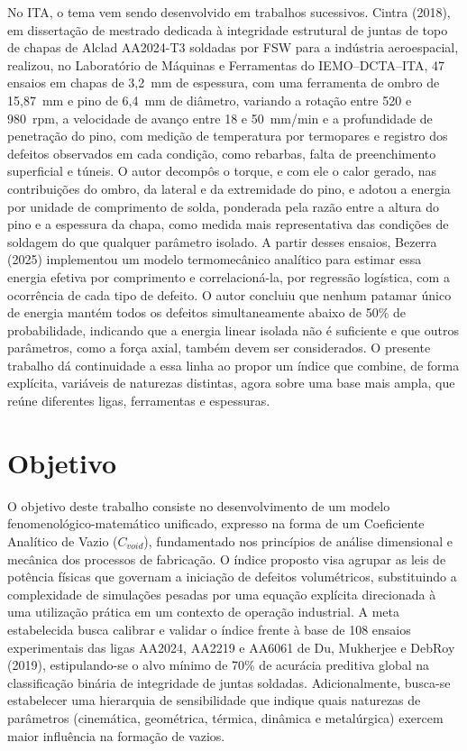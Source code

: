 \documentclass[12pt,openany]{report}
\begin{document}
No ITA, o tema vem sendo desenvolvido em trabalhos sucessivos. Cintra (2018), em dissertação de mestrado dedicada à integridade estrutural de juntas de topo de chapas de Alclad AA2024-T3 soldadas por FSW para a indústria aeroespacial, realizou, no Laboratório de Máquinas e Ferramentas do IEMO--DCTA--ITA, 47 ensaios em chapas de 3,2~mm de espessura, com uma ferramenta de ombro de 15,87~mm e pino de 6,4~mm de diâmetro, variando a rotação entre 520 e 980~rpm, a velocidade de avanço entre 18 e 50~mm/min e a profundidade de penetração do pino, com medição de temperatura por termopares e registro dos defeitos observados em cada condição, como rebarbas, falta de preenchimento superficial e túneis. O autor decompôs o torque, e com ele o calor gerado, nas contribuições do ombro, da lateral e da extremidade do pino, e adotou a energia por unidade de comprimento de solda, ponderada pela razão entre a altura do pino e a espessura da chapa, como medida mais representativa das condições de soldagem do que qualquer parâmetro isolado. A partir desses ensaios, Bezerra (2025) implementou um modelo termomecânico analítico para estimar essa energia efetiva por comprimento e correlacioná-la, por regressão logística, com a ocorrência de cada tipo de defeito. O autor concluiu que nenhum patamar único de energia mantém todos os defeitos simultaneamente abaixo de 50\% de probabilidade, indicando que a energia linear isolada não é suficiente e que outros parâmetros, como a força axial, também devem ser considerados. O presente trabalho dá continuidade a essa linha ao propor um índice que combine, de forma explícita, variáveis de naturezas distintas, agora sobre uma base mais ampla, que reúne diferentes ligas, ferramentas e espessuras.

\section{Objetivo}

O objetivo deste trabalho consiste no desenvolvimento de um modelo fenomenológico-matemático unificado, expresso na forma de um Coeficiente Analítico de Vazio ($C_{void}$), fundamentado nos princípios de análise dimensional e mecânica dos processos de fabricação. O índice proposto visa agrupar as leis de potência físicas que governam a iniciação de defeitos volumétricos, substituindo a complexidade de simulações pesadas por uma equação explícita direcionada à uma utilização prática em um contexto de operação industrial. A meta estabelecida busca calibrar e validar o índice frente à base de 108 ensaios experimentais das ligas AA2024, AA2219 e AA6061 de Du, Mukherjee e DebRoy (2019), estipulando-se o alvo mínimo de 70\% de acurácia preditiva global na classificação binária de integridade de juntas soldadas. Adicionalmente, busca-se estabelecer uma hierarquia de sensibilidade que indique quais naturezas de parâmetros (cinemática, geométrica, térmica, dinâmica e metalúrgica) exercem maior influência na formação de vazios.
\end{document}
